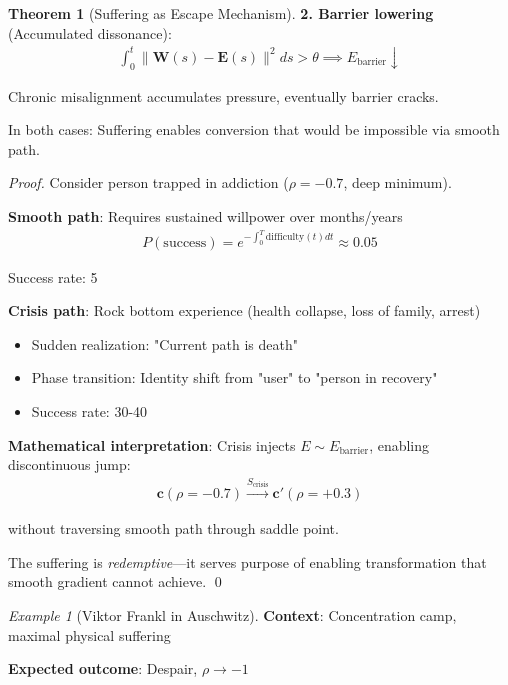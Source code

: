 \documentclass[11pt,a4paper]{article}
\theoremstyle{definition}
\newtheorem{theorem}{Theorem}[section]
\theoremstyle{remark}
\newtheorem{example}{Example}[section]
\newcommand{\EE}{\mathbf{E}}
\newcommand{\WW}{\mathbf{W}}
\newcommand{\cc}{\mathbf{c}}
\begin{document}
\begin{enumerate}
\begin{theorem}[Suffering as Escape Mechanism]
\textbf{2. Barrier lowering} (Accumulated dissonance):
\begin{align}
\int_0^t \|\WW(s) - \EE(s)\|^2 ds > \theta \implies E_{\text{barrier}} \downarrow
\end{align}

Chronic misalignment accumulates pressure, eventually barrier cracks.

In both cases: Suffering enables conversion that would be impossible via smooth path.
\end{theorem}

\begin{proof}
Consider person trapped in addiction (\(\rho = -0.7\), deep minimum).

\textbf{Smooth path}: Requires sustained willpower over months/years
\begin{align}
P(\text{success}) = e^{-\int_0^T \text{difficulty}(t) dt} \approx 0.05
\end{align}

Success rate: 5%

\textbf{Crisis path}: Rock bottom experience (health collapse, loss of family, arrest)
\begin{itemize}
    \item Sudden realization: "Current path is death"
    \item Phase transition: Identity shift from "user" to "person in recovery"
    \item Success rate: 30-40%
\end{itemize}

\textbf{Mathematical interpretation}: Crisis injects \(E \sim E_{\text{barrier}}\), enabling discontinuous jump:
\begin{align}
\cc(\rho = -0.7) \xrightarrow{S_{\text{crisis}}} \cc'(\rho = +0.3)
\end{align}

without traversing smooth path through saddle point.

The suffering is \textit{redemptive}—it serves purpose of enabling transformation that smooth gradient cannot achieve. \qed
\end{proof}

\begin{example}[Viktor Frankl in Auschwitz]
\textbf{Context}: Concentration camp, maximal physical suffering

\textbf{Expected outcome}: Despair, \(\rho \to -1\)


\end{example}
\end{enumerate}
\end{document}
